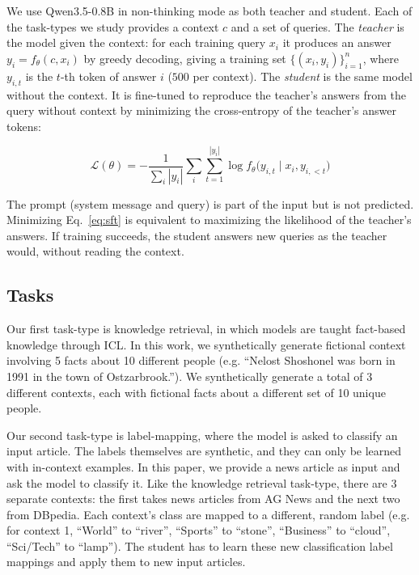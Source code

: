 \documentclass{article} %
\begin{document}
We use Qwen3.5-0.8B in non-thinking mode as both teacher and student. Each of the task-types we study provides a context $c$ and a set of queries. The \emph{teacher} is the model given the context:
for each training query $x_i$ it produces an answer $y_i = f_\theta(c, x_i)$ by greedy decoding,
giving a training set $\{(x_i, y_i)\}_{i=1}^{n}$, where $y_{i,t}$ is the $t$-th token of answer $i$
($500$ per context). The \emph{student} is the same model without the context. It is fine-tuned
to reproduce the teacher's answers from the query without context  by minimizing the cross-entropy of the teacher's answer tokens:



\begin{equation}
  \mathcal{L}(\theta) = -\frac{1}{\sum_i |y_i|}\sum_{i}\sum_{t=1}^{|y_i|} \log f_\theta\big(y_{i,t} \mid x_i, y_{i,<t}\big)
  \label{eq:sft}
\end{equation}




The prompt (system message and query) is part of the
input but is not predicted. Minimizing Eq.~\ref{eq:sft} is equivalent to maximizing the likelihood
of the teacher's answers. If training succeeds, the student answers new queries as the teacher
would, without reading the context.

\subsection{Tasks}

Our first task-type is knowledge retrieval, in which models are taught fact-based knowledge through ICL. In this work, we synthetically generate fictional context involving 5 facts about 10 different people (e.g. ``Nelost Shoshonel was born in 1991 in the town of Ostzarbrook.''). We synthetically generate a total of 3 different contexts, each with fictional facts about a different set of 10 unique people.

Our second task-type is label-mapping, where the model is asked to classify an input article. The labels themselves are synthetic, and they can only be learned with in-context examples. In this paper, we provide a news article as input and ask the model to classify it. Like the knowledge retrieval task-type, there are 3 separate contexts: the first takes news articles from AG News and the next two from DBpedia. Each context's class are mapped to a different, random label (e.g. for context 1, ``World'' to ``river'', ``Sports'' to ``stone'', ``Business'' to ``cloud'', ``Sci/Tech'' to ``lamp''). The student has to learn these new classification label mappings and apply them to new input articles.
\end{document}
